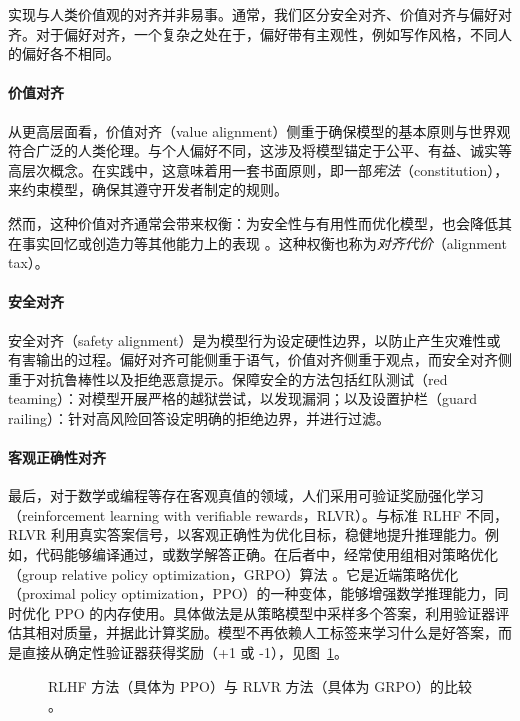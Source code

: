 实现与人类价值观的对齐并非易事。通常，我们区分安全对齐、价值对齐与偏好对齐。对于偏好对齐，一个复杂之处在于，偏好带有主观性，例如写作风格，不同人的偏好各不相同。

\paragraph{价值对齐}
从更高层面看，价值对齐（value alignment）侧重于确保模型的基本原则与世界观符合广泛的人类伦理。与个人偏好不同，这涉及将模型锚定于公平、有益、诚实等高层次概念。在实践中，这意味着用一套书面原则，即一部{\em 宪法}（constitution），来约束模型，确保其遵守开发者制定的规则。

然而，这种价值对齐通常会带来权衡：为安全性与有用性而优化模型，也会降低其在事实回忆或创造力等其他能力上的表现 \citep{lin2024mitigating}。这种权衡也称为{\em 对齐代价}（alignment tax）。

\paragraph{安全对齐}
安全对齐（safety alignment）是为模型行为设定硬性边界，以防止产生灾难性或有害输出的过程。偏好对齐可能侧重于语气，价值对齐侧重于观点，而安全对齐侧重于对抗鲁棒性以及拒绝恶意提示。保障安全的方法包括红队测试（red teaming）：对模型开展严格的越狱尝试，以发现漏洞；以及设置护栏（guard railing）：针对高风险回答设定明确的拒绝边界，并进行过滤。

\paragraph{客观正确性对齐}
最后，对于数学或编程等存在客观真值的领域，人们采用可验证奖励强化学习（reinforcement learning with verifiable rewards，RLVR）\citep{lambert2024tulu}。与标准 RLHF 不同，RLVR 利用真实答案信号，以客观正确性为优化目标，稳健地提升推理能力。例如，代码能够编译通过，或数学解答正确。在后者中，经常使用组相对策略优化（group relative policy optimization，GRPO）算法 \citep{guo2025deepseek}。它是近端策略优化（proximal policy optimization，PPO）的一种变体，能够增强数学推理能力，同时优化 PPO 的内存使用。具体做法是从策略模型中采样多个答案，利用验证器评估其相对质量，并据此计算奖励。模型不再依赖人工标签来学习什么是好答案，而是直接从确定性验证器获得奖励（+1 或 -1）\citep{guo2025deepseek, shao2024deepseekmath}，见图~\ref{fig:grpo}。

\begin{figure}[tb]
    \centering
    
    \caption{RLHF 方法（具体为 PPO）与 RLVR 方法（具体为 GRPO）的比较 \citep{shao2024deepseekmath}。}
    \label{fig:grpo}
\end{figure}

